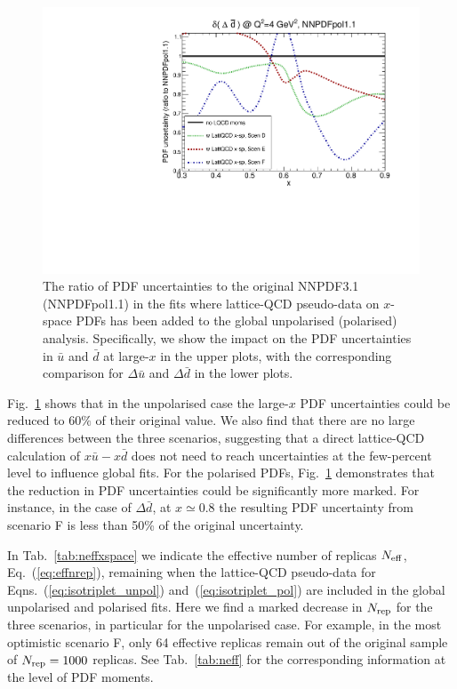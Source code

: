 \begin{figure}[!t]
\includegraphics[scale=0.45]{plots/xdbar-pol-lattice-relerr-xdata-xspace.pdf}
\caption{\small The ratio of PDF uncertainties to the original
  NNPDF3.1 (NNPDFpol1.1) in the fits where lattice-QCD pseudo-data
  on $x$-space PDFs has been added to the global unpolarised
  (polarised) analysis.
  Specifically, we show the impact on the PDF uncertainties
  in $\bar{u}$ and $\bar{d}$ at large-$x$ in the upper
  plots, with the corresponding comparison for $\Delta\bar{u}$
  and $\Delta\bar{d}$ in the lower plots.
}    
\label{fig:impactxspace}
\end{figure}

Fig.~\ref{fig:impactxspace} shows that
in the unpolarised case the large-$x$ PDF uncertainties could be reduced
to $60\%$ of their original value.
%
We also find that there are no large
differences between the three
scenarios, suggesting that a direct lattice-QCD calculation
of $x \bar{u}-x \bar{d}$ does not need to reach uncertainties
at the few-percent level to influence global fits.
%
For the polarised PDFs, Fig.~\ref{fig:impactxspace} demonstrates that the
reduction in PDF uncertainties could be significantly more marked.
%
For instance, in the case of $\Delta \bar{d}$, at $x\simeq 0.8$
the resulting PDF uncertainty from scenario F is less than 50\%
of the original uncertainty.

In Tab.~\ref{tab:neffxspace} we indicate the effective number of replicas
$N_{\rm eff}$, Eq.~(\ref{eq:effnrep}), remaining when
the lattice-QCD pseudo-data for Eqns.~(\ref{eq:isotriplet_unpol})
and~(\ref{eq:isotriplet_pol}) are included in the global
   unpolarised and polarised fits.
   Here we find a marked decrease in $N_{\rm rep}$
   for the three scenarios,
   in particular for the unpolarised case.
   For example, in the most optimistic scenario F, only
   64 effective replicas remain out of the
   original sample of $N_{\rm rep}=1000$ replicas.
   See Tab.~\ref{tab:neff} for the corresponding
   information at the level of PDF moments.
   
